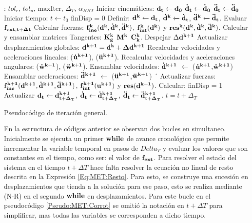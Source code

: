 \begin{algorithm}\label{Pseudo:MET:Corrot}
	\begin{algorithmic} 
		\REQUIRE: $tol_r$, $tol_u$, $\text{maxIter}$, $\Delta_T$, $\alpha_{HHT}$
		\STATE Iniciar cinemáticas: $\bf{d_t}\xleftarrow[]{}\bf{d_0}$
		$\bf{\dot{d}_t}\xleftarrow[]{}\bf{\dot{d}_0}$
		$\bf{\ddot{d}_t}\xleftarrow[]{}\bf{\ddot{d}_0}$ 
		\STATE Iniciar tiempo: $t\xleftarrow{}t_0$
			\STATE finDisp = $0$
			\STATE Definir: $\bf{d^k}\xleftarrow[]{}\bf{d_t}$, $\bf{\dot{d}^k}\xleftarrow[]{}\bf{\dot{d}_t}$, $\bf{\ddot{d}^k}\xleftarrow[]{}\bf{\ddot{d}_t}$.
			\STATE Evaluar $\bf{f_{ext,t+\Delta t}}$	
				\STATE Calcular fuerzas: $\bf{f}_{ine}^k(\bf{d}^k,\bf{\dot{d}}^k,\bf{\ddot{d}}^k)$,  $\bf{f}_{int}^k(\bf{d}^k)$ y $\bf{res}^{k}(\bf{d}^k,\bf{\dot{d}}^k,\bf{\ddot{d}}^k)$. 
				\STATE Calcular y ensamblar matrices Tangentes: $\bf{K}_g^k$ $\bf{M}^k$  $\bf{C}_k^k$. 
				\STATE Despejar $\Delta \bf{d}^{k+1}$ 
				\STATE Actualizar desplazamientos globales:  $\bf{d}^{k+1} = \bf{d}^{k} + \Delta\bf{d}^{k+1}$ 
				\STATE Recalcular velocidades y aceleraciones lineales: ($\bf{\dot{u}}^{k+1}$), ($\bf{\ddot{u}}^{k+1}$).
				\STATE Recalcular velocidades y aceleraciones angulares: ($\bf{\dot{w}}^{k+1}$), ($\bf{\ddot{w}}^{k+1}$).
				\STATE Ensamblar velocidades: $\bf{\dot{d}}^{k+1}$ $\leftarrow$ ($\bf{\dot{u}}^{k+1}$,$\bf{\dot{w}}^{k+1}$)
				\STATE Ensamblar aceleraciones: $\bf{\ddot{d}}^{k+1}$ $\leftarrow$ ($\bf{\ddot{u}}^{k+1}$,$\bf{\ddot{w}}^{k+1}$)
´				\STATE Actualizar fuerzas: $\bf{f}_{ine}^{k+1}(\bf{d}^{k+1},\bf{\dot{d}}^{k+1},\bf{\ddot{d}}^{k+1})$,  $\bf{f}_{int}^{k+1}(\bf{u}^{k+1})$ y $\bf{res}(\bf{d}^{k+1})$. 
				\STATE Calcular: 
				\STATE finDisp = 1
				\ENDIF
			\ENDWHILE
			\STATE Actualizar $\bf{d_{t}}\xleftarrow[]{}\bf{d^{k+1}_{t+\Delta_T}}$, $\bf{\dot{d}_{t}}\xleftarrow[]{}\bf{\dot{d}^{k+1}_{t+\Delta_T}}$, $\bf{\ddot{d}_t}\xleftarrow[]{}\bf{\ddot{d}^{k+1}_{t+\Delta_T}}$.
			\STATE $t = t+\Delta_T$	
 		\ENDWHILE
	\end{algorithmic}
\caption{Pseudocódigo de iteración general. }
\end{algorithm}

En la estructura de códigos anterior se observan dos bucles en simultaneo. Inicialmente se ejecuta un primer $\bf{while}$ de avance cronológico que permite incrementar la variable temporal en pasos de $Delta_T$ y evaluar los valores que son constantes en el tiempo, como ser: el valor de $\bf{f}_{ext}$. Para resolver el estado del sistema en el tiempo $t+\Delta T$ hace falta resolver la ecuación no lineal de resto descrita en la Expresión \eqref{Eq:MET:Resto}. Para esto, se construye una sucesión en desplazamientos que tienda a la solución para ese paso, esto se realiza mediante (N-R) en el segundo $\bf{while}$ en desplazamientos. Para este bucle en el pseudocódigo \ref{Pseudo:MET:Corrot} se omitió la notación en $t+\Delta T$ para simplificar, mas todas las variables se corresponden a dicho tiempo.

